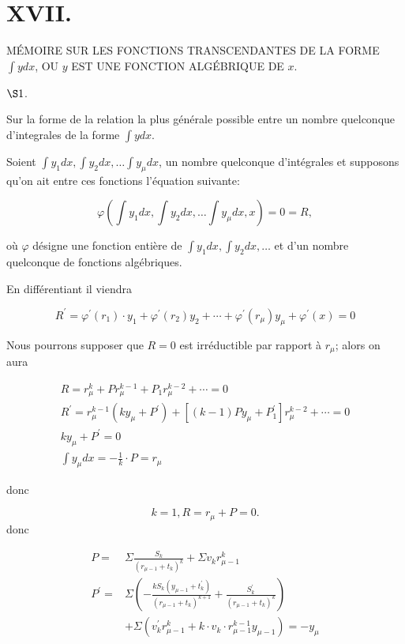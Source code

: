 \documentclass{article}
\begin{document}
\section*{XVII.}

MÉMOIRE SUR LES FONCTIONS TRANSCENDANTES DE LA FORME \(\int y d x\), OU \(y\) EST UNE FONCTION ALGÉBRIQUE DE \(x\).

\(\S 1\).

Sur la forme de la relation la plus générale possible entre un nombre quelconque d'integrales de la forme \(\int y d x\).

Soient \(\int y_{1} d x, \int y_{2} d x, \ldots \int y_{\mu} d x\), un nombre quelconque d'intégrales et supposons qu'on ait entre ces fonctions l'équation suivante:

\[
\varphi\left(\int y_{1} d x, \int y_{2} d x, \ldots \int y_{\mu} d x, x\right)=0=R,
\]

où \(\varphi\) désigne une fonction entière de \(\int y_{1} d x, \int y_{2} d x, \ldots\) et d'un nombre quelconque de fonctions algébriques.

En différentiant il viendra

\[
R^{\prime}=\varphi^{\prime}\left(r_{1}\right) \cdot y_{1}+\varphi^{\prime}\left(r_{2}\right) y_{2}+\cdots+\varphi^{\prime}\left(r_{\mu}\right) y_{\mu}+\varphi^{\prime}(x)=0
\]

Nous pourrons supposer que \(R=0\) est irréductible par rapport à \(r_{\mu}\); alors on aura

\[
\begin{gathered}
R=r_{\mu}^{k}+P r_{\mu}^{k-1}+P_{1} r_{\mu}^{k-2}+\cdots=0 \\
R^{\prime}=r_{\mu}^{k-1}\left(k y_{\mu}+P^{\prime}\right)+\left[(k-1) P y_{\mu}+P_{1}^{\prime}\right] r_{\mu}^{k-2}+\cdots=0 \\
k y_{\mu}+P^{\prime}=0 \\
\int y_{\mu} d x=-\frac{1}{k} \cdot P=r_{\mu}
\end{gathered}
\]

donc

\[
k=1, R=r_{\mu}+P=0 .
\]
donc

\[
\begin{aligned}
P= & \Sigma \frac{S_{k}}{\left(r_{\mu-1}+t_{k}\right)^{k}}+\Sigma v_{k} r_{\mu-1}^{k} \\
P^{\prime}= & \Sigma\left(-\frac{k S_{k}\left(y_{\mu-1}+t_{k}^{\prime}\right)}{\left(r_{\mu-1}+t_{k}\right)^{k+1}}+\frac{S_{k}^{\prime}}{\left(r_{\mu-1}+t_{k}\right)^{k}}\right) \\
& +\Sigma\left(v_{k}^{\prime} r_{\mu-1}^{k}+k \cdot v_{k} \cdot r_{\mu-1}^{k-1} y_{\mu-1}\right)=-y_{\mu}
\end{aligned}
\]
\end{document}

